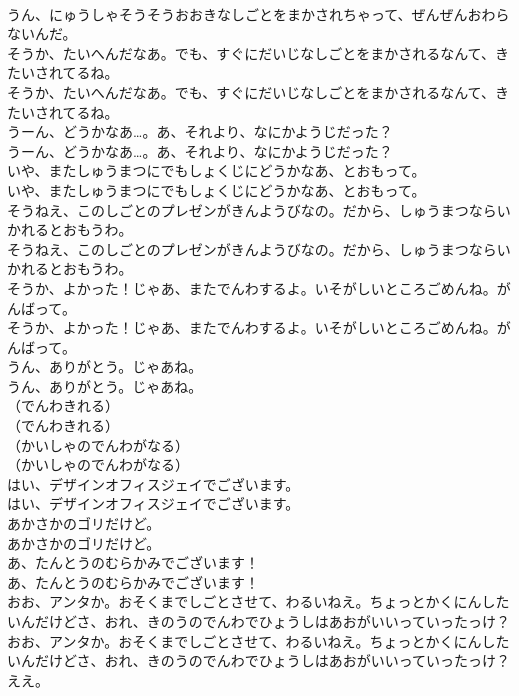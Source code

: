 \documentclass[8pt]{extreport}
\begin{document}
\begin{CJK}{UTF8}{min}
\\	うん、にゅうしゃそうそうおおきなしごとをまかされちゃって、ぜんぜんおわらないんだ。 
\\	そうか、たいへんだなあ。でも、すぐにだいじなしごとをまかされるなんて、きたいされてるね。	
\\	そうか、たいへんだなあ。でも、すぐにだいじなしごとをまかされるなんて、きたいされてるね。 
\\	うーん、どうかなあ…。あ、それより、なにかようじだった？	
\\	うーん、どうかなあ…。あ、それより、なにかようじだった？ 
\\	いや、またしゅうまつにでもしょくじにどうかなあ、とおもって。	
\\	いや、またしゅうまつにでもしょくじにどうかなあ、とおもって。 
\\	そうねえ、このしごとのプレゼンがきんようびなの。だから、しゅうまつならいかれるとおもうわ。	
\\	そうねえ、このしごとのプレゼンがきんようびなの。だから、しゅうまつならいかれるとおもうわ。 
\\	そうか、よかった！じゃあ、またでんわするよ。いそがしいところごめんね。がんばって。	
\\	そうか、よかった！じゃあ、またでんわするよ。いそがしいところごめんね。がんばって。 
\\	うん、ありがとう。じゃあね。	
\\	うん、ありがとう。じゃあね。 
\\	（でんわきれる）	
\\	（でんわきれる） 
\\	（かいしゃのでんわがなる）	
\\	（かいしゃのでんわがなる） 
\\	はい、デザインオフィスジェイでございます。	
\\	はい、デザインオフィスジェイでございます。 
\\	あかさかのゴリだけど。	
\\	あかさかのゴリだけど。 
\\	あ、たんとうのむらかみでございます！	
\\	あ、たんとうのむらかみでございます！ 
\\	おお、アンタか。おそくまでしごとさせて、わるいねえ。ちょっとかくにんしたいんだけどさ、おれ、きのうのでんわでひょうしはあおがいいっていったっけ？	
\\	おお、アンタか。おそくまでしごとさせて、わるいねえ。ちょっとかくにんしたいんだけどさ、おれ、きのうのでんわでひょうしはあおがいいっていったっけ？ 
\\	ええ。	

\end{CJK}
\end{document}
